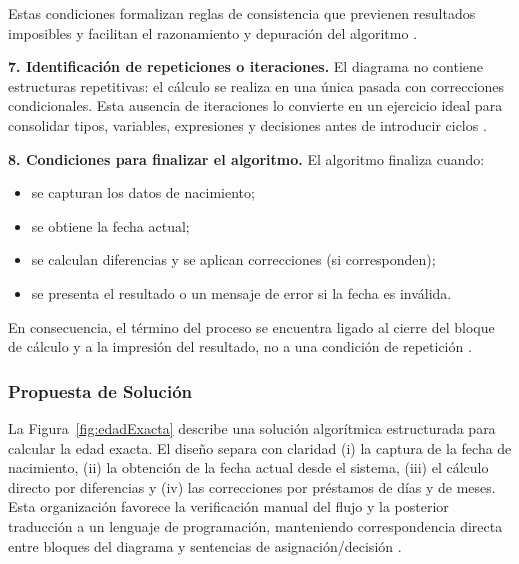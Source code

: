 \documentclass[12pt,twoside]{book}
\begin{document}
						\noindent
						Estas condiciones formalizan reglas de consistencia que previenen resultados imposibles y facilitan el razonamiento y depuración del algoritmo \cite{Qian2018Students,Robins2003Learning}.
						
						\noindent
						\textbf{7. Identificación de repeticiones o iteraciones.}
						El diagrama no contiene estructuras repetitivas: el cálculo se realiza en una única pasada con correcciones condicionales. Esta ausencia de iteraciones lo convierte en un ejercicio ideal para consolidar tipos, variables, expresiones y decisiones antes de introducir ciclos \cite{Farrell2018Programming,Gaddis2022Starting}.
						
						\textbf{8. Condiciones para finalizar el algoritmo.}
						El algoritmo finaliza cuando:
						
						\begin{itemize}
							\item se capturan los datos de nacimiento;
							\item se obtiene la fecha actual;
							\item se calculan diferencias y se aplican correcciones (si corresponden);
							\item se presenta el resultado o un mensaje de error si la fecha es inválida.
						\end{itemize}
						
						\noindent
						En consecuencia, el término del proceso se encuentra ligado al cierre del bloque de cálculo y a la impresión del resultado, no a una condición de repetición \cite{Sebesta2018Concepts}.
						
					\subsubsection{Propuesta de Solución}
						\noindent
						La Figura~\ref{fig:edadExacta} describe una solución algorítmica estructurada para calcular la edad exacta. El diseño separa con claridad (i) la captura de la fecha de nacimiento, (ii) la obtención de la fecha actual desde el sistema, (iii) el cálculo directo por diferencias y (iv) las correcciones por préstamos de días y de meses. Esta organización favorece la verificación manual del flujo y la posterior traducción a un lenguaje de programación, manteniendo correspondencia directa entre bloques del diagrama y sentencias de asignación/decisión \cite{Hooshyar2015Flowchart,Farrell2018Programming}.
						
\end{document}
